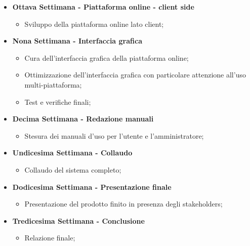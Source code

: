 {\begin{itemize}
\begin{itemize}
        \end{itemize}
        \item \textbf{Ottava Settimana - Piattaforma online - client side} 
        \begin{itemize}
            \item Sviluppo della piattaforma online lato client;
        \end{itemize}
        \item \textbf{Nona Settimana - Interfaccia grafica} 
        \begin{itemize}
            \item Cura dell'interfaccia grafica della piattaforma online;
            \item Ottimizzazione dell'interfaccia grafica con particolare attenzione all'uso multi-piattaforma;
            \item Test e verifiche finali;
        \end{itemize}
        \item \textbf{Decima Settimana - Redazione manuali} 
        \begin{itemize}
            \item Stesura dei manuali d'uso per l'utente e l'amministratore;
        \end{itemize}
        \item \textbf{Undicesima Settimana - Collaudo} 
        \begin{itemize}
            \item Collaudo del sistema completo;
        \end{itemize}
        \item \textbf{Dodicesima Settimana - Presentazione finale} 
        \begin{itemize}
            \item Presentazione del prodotto finito in presenza degli stakeholders;
        \end{itemize}
        \item \textbf{Tredicesima Settimana - Conclusione}
        \begin{itemize}
            \item Relazione finale;
        \end{itemize}
    \end{itemize}
}

\newcommand{\totaleOre}{}

\newcommand{\obiettiviObbligatori}{
	 \item \underline{\textit{O01}}: primo obiettivo;
	 \item \underline{\textit{O02}}: secondo obiettivo;
	 \item \underline{\textit{O03}}: terzo obiettivo;
	 
}

